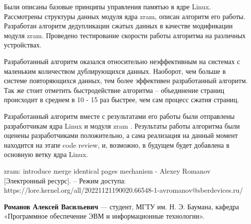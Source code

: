 \documentclass[12pt, a4paper]{article}
\begin{document}
Были описаны базовые принципы управления памятью в ядре Linux. Рассмотрены структуры данных модуля ядра zram, описан алгоритм его работы. Разработан алгоритм дедупликации сжатых данных в качестве модификации модуля zram. Проведено тестирование скорости работы алгоритма на различных устройствах. 

Разработанный алгоритм оказался относительно неэффективным на системах с маленьким количеством дублирующихся данных. Наоборот, чем больше в системе повторяющихся данных, тем более эффективен разработанный алгоритм. Так же стоит отметить быстродействие алгоритма -- объединение страниц происходит в среднем в 10 - 15 раз быстрее, чем сам процесс сжатия страниц.

Разработанный алгоритм вместе с результатами его работы были отправлены разработчикам ядра Linux и модуля zram \cite{1}. Результаты работы алгоритма были оценены разработчиками положительно, а сама реализация на данный момент находится на этапе code review, и, возможно, в будущем будет добавлена в основную ветку ядра Linux.

\begin{thebibliography}{5}
	 zram: introduce merge identical pages mechanism - Alexey Romanov [Электронный ресурс]. -- Режим доступа: https://lore.kernel.org/all/20221121190020.66548-1-avromanov@sberdevices.ru/
\end{thebibliography}

\noindent \textbf{Романов Алексей Васильевич} — студент, МГТУ им. Н. Э. Баумана, кафедра «Программное обеспечение ЭВМ и информационные технологии».
\end{document}
